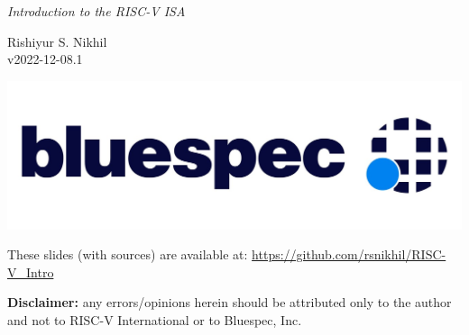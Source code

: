 \documentclass{article}
\newcommand{\docversion}{v2022-12-08.1}
\begin{document}

\vspace*{0.5in}

\begin{center}\Huge
  \emph{Introduction to the RISC-V ISA}

  \vspace*{0.5in}

  Rishiyur S. Nikhil \\
  {\docversion}

  \vspace*{1in}

  \includegraphics[scale=0.7]{Figs/Bluespec_Logo_2022-10.jpg}

  \vfill

  \begin{minipage}{8in}\Large
    These slides (with sources) are available at: \url{https://github.com/rsnikhil/RISC-V_Intro}

    \vspace{1ex}

    {\bf Disclaimer:} any errors/opinions herein should be attributed
    only to the author and not to RISC-V International or to
    Bluespec, Inc.
  \end{minipage}

\end{center}

\clearpage

\end{document}
